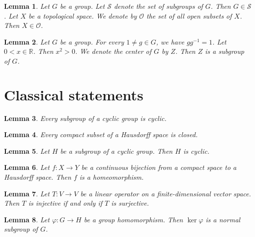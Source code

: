 \documentclass{article}
\newtheorem{lemma}{Lemma}
\begin{document}
\begin{lemma}\label{set-of}
Let $G$ be a group. Let $\mathcal{S}$ denote the set of subgroups of $G$. Then $G\in\mathcal{S}$. Let $X$ be a topological space. We denote by $\mathcal{O}$ the set of all open subsets of $X$. Then $X\in\mathcal{O}$.
\end{lemma}

\begin{lemma}\label{chained-binders}
Let $G$ be a group. For every $1\neq g\in G$, we have $gg^{-1}=1$. Let $0<x\in\mathbb{R}$. Then $x^2>0$. We denote the center of $G$ by $Z$. Then $Z$ is a subgroup of $G$.
\end{lemma}

\section{Classical statements}


\begin{lemma}\label{nested-indefinites}
Every subgroup of a cyclic group is cyclic.
\end{lemma}

\begin{lemma}\label{nested-subsets}
Every compact subset of a Hausdorff space is closed.
\end{lemma}

\begin{lemma}\label{nested-let}
Let $H$ be a subgroup of a cyclic group. Then $H$ is cyclic.
\end{lemma}

\begin{lemma}\label{nested-signature}
Let $f\colon X\to Y$ be a continuous bijection from a compact space to a Hausdorff space. Then $f$ is a homeomorphism.
\end{lemma}

\begin{lemma}\label{nested-operator}
Let $T\colon V\to V$ be a linear operator on a finite-dimensional vector space. Then $T$ is injective if and only if $T$ is surjective.
\end{lemma}

\begin{lemma}\label{signature-kinds}
Let $\varphi\colon G\to H$ be a group homomorphism. Then $\ker\varphi$ is a normal subgroup of $G$.
\end{lemma}
\end{document}
